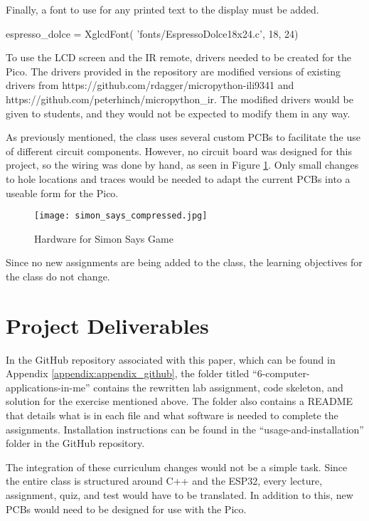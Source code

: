 \begin{tcolorbox}[breakable, enhanced jigsaw, title=ME 400: Assignment \ref{comp_app_assignment_1}, 
    colframe=ksu-purple, colback=ksu-gray]
Finally, a font to use for any printed text to the display must be added.

\begin{python}
espresso_dolce = XglcdFont(
    'fonts/EspressoDolce18x24.c', 18, 24)
\end{python}
\end{tcolorbox}

To use the LCD screen and the IR remote, drivers needed to be created for the Pico. 
The drivers provided in the repository are modified versions of
existing drivers from https://github.com/rdagger/micropython-ili9341 and 
https://github.com/peterhinch/micropython\_ir. The modified drivers would be given to 
students, and they would not be expected to modify them in any way.

As previously mentioned, the class uses several custom PCBs to facilitate the use
of different circuit components. However, no circuit board was designed for this 
project, so the wiring was done by hand, as seen in Figure \ref{fig:simon_says}. Only 
small changes to hole locations and traces would be needed to adapt the current PCBs 
into a useable form for the Pico.

\begin{figure}[h]
    \texttt{[image: simon\_says\_compressed.jpg]}
    \centering
    \caption{Hardware for Simon Says Game}
    \centering
    \label{fig:simon_says}
\end{figure}

Since no new assignments are being added to the class, the learning objectives for the 
class do not change.

\section{Project Deliverables}

In the GitHub repository associated with this paper, which can be found in Appendix
\ref{appendix:appendix_github}, the folder titled ``6-computer-applications-in-me'' 
contains the rewritten lab assignment, code skeleton, and solution for the exercise
mentioned above. The folder also contains a README that details what is in each file
and what software is needed to complete the assignments. Installation instructions can
be found in the ``usage-and-installation'' folder in the GitHub repository.

The integration of these curriculum changes would not be a simple task. Since the 
entire class is structured around C++ and the ESP32, every lecture, assignment, quiz,
and test would have to be translated. In addition to this, new PCBs would need to be 
designed for use with the Pico. 
